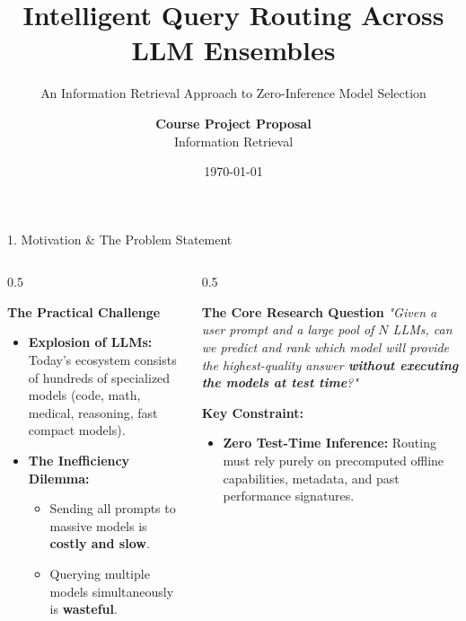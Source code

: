 \documentclass[aspectratio=169, 10pt]{beamer}
\title[\textbf{TREC LLM Routing}]{\LARGE \textbf{Intelligent Query Routing Across LLM Ensembles}}
\subtitle{\large An Information Retrieval Approach to Zero-Inference Model Selection}
\author{\textbf{Course Project Proposal} \\ Information Retrieval}
\institute{TREC Million LLMs Track (NIST)}
\date{\today}
\begin{document}
\begin{frame}[plain]
    \titlepage
\end{frame}

\begin{frame}{1. Motivation \& The Problem Statement}
    \begin{columns}[T]
        \begin{column}{0.5\textwidth}
            \begin{block}{\textbf{The Practical Challenge}}
                \begin{itemize}
                    \item \textbf{Explosion of LLMs:} Today's ecosystem consists of hundreds of specialized models (code, math, medical, reasoning, fast compact models).
                    \item \textbf{The Inefficiency Dilemma:} 
                    \begin{itemize}
                        \item Sending all prompts to massive models is \textbf{costly and slow}.
                        \item Querying multiple models simultaneously is \textbf{wasteful}.
                    \end{itemize}
                \end{itemize}
            \end{block}
        \end{column}

        \begin{column}{0.5\textwidth}
            \begin{alertblock}{\textbf{The Core Research Question}}
                \textit{"Given a user prompt and a large pool of $N$ LLMs, can we predict and rank which model will provide the highest-quality answer \textbf{without executing the models at test time}?"}
            \end{alertblock}
            
            \vspace{0.3cm}
            \textbf{Key Constraint:} 
            \begin{itemize}
                \item \textbf{Zero Test-Time Inference:} Routing must rely purely on precomputed offline capabilities, metadata, and past performance signatures.
            \end{itemize}
        \end{column}
    \end{columns}
\end{frame}
\end{document}
